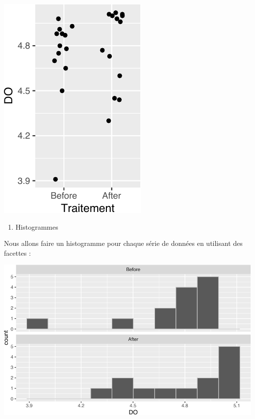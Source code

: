 \documentclass[
  a4paper,
]{article}
\newenvironment{Shaded}{\begin{snugshade}}{\end{snugshade}}
\newcommand{\DataTypeTok}[1]{\textcolor[rgb]{0.00,0.34,0.68}{#1}}
\newcommand{\DecValTok}[1]{\textcolor[rgb]{0.69,0.50,0.00}{#1}}
\newcommand{\FloatTok}[1]{\textcolor[rgb]{0.69,0.50,0.00}{#1}}
\newcommand{\KeywordTok}[1]{\textcolor[rgb]{0.12,0.11,0.11}{\textbf{#1}}}
\newcommand{\NormalTok}[1]{\textcolor[rgb]{0.12,0.11,0.11}{#1}}
\newcommand{\OperatorTok}[1]{\textcolor[rgb]{0.12,0.11,0.11}{#1}}
\newcommand{\StringTok}[1]{\textcolor[rgb]{0.75,0.01,0.01}{#1}}
\providecommand{\tightlist}{%
  \setlength{\itemsep}{0pt}\setlength{\parskip}{0pt}}
\begin{document}
\begin{center}\includegraphics[width=0.25\linewidth]{figure/unnamed-chunk-32-1} \end{center}

\begin{enumerate}
\def\labelenumi{\arabic{enumi}.}
\setcounter{enumi}{1}
\tightlist
\item
  Histogrammes
\end{enumerate}

Nous allons faire un histogramme pour chaque série de données en utilisant des facettes :

\begin{Shaded}
\end{Shaded}

\begin{center}\includegraphics[width=0.9\linewidth]{figure/unnamed-chunk-33-1} \end{center}
\end{document}

